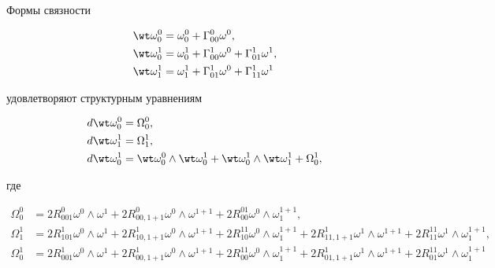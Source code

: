 Формы связности 


\begin{align*} 


\wt\omega^0_0&=\omega^0_0+\Gamma^0_{00}\omega^0,\\ 


\wt\omega^1_0&=\omega^1_0+\Gamma^1_{00}\omega^0+ 


\Gamma^1_{01}\omega^1,\\ 


\wt\omega^1_1&=\omega^1_1+\Gamma^1_{01}\omega^0+ 


\Gamma^1_{11}\omega^1 


\end{align*} 


удовлетворяют структурным уравнениям 


\begin{align*} 


d\wt\omega^0_0&=\Omega^0_0,\\ 


%


d\wt\omega^1_1&=\Omega^1_1,\\ 


%


d\wt\omega^1_0&=\wt\omega^0_0\wedge\wt\omega^1_0+ \wt\omega^1_0\wedge


\wt\omega^1_1+\Omega^1_0, 


\end{align*} 


где 


\begin{align*} 


\Omega^0_0&=2R^0_{001}\omega^0\wedge\omega^1+ 


2R^0_{00,1+1}\omega^0\wedge\omega^{1+1}+ 


2R^{01}_{00}\omega^0\wedge\omega^{1+1}_1,\\ 


%


\Omega^1_1&=2R^1_{101}\omega^0\wedge\omega^1+ 


2R^1_{10,1+1}\omega^0\wedge\omega^{1+1}+ 


2R^{11}_{10}\omega^0\wedge\omega^{1+1}_1+ 


2R^1_{11,1+1}\omega^1\wedge\omega^{1+1}+ 


2R^{11}_{11}\omega^1\wedge\omega^{1+1}_1,\\ 


%


\Omega^1_0&=2R^1_{001}\omega^0\wedge\omega^1+ 


2R^1_{00,1+1}\omega^0\wedge\omega^{1+1}+ 


2R^{11}_{00}\omega^0\wedge\omega^{1+1}_1+ 


2R^1_{01,1+1}\omega^1\wedge\omega^{1+1}+ 


2R^{11}_{01}\omega^1\wedge\omega^{1+1}_1 


\end{align*} 


